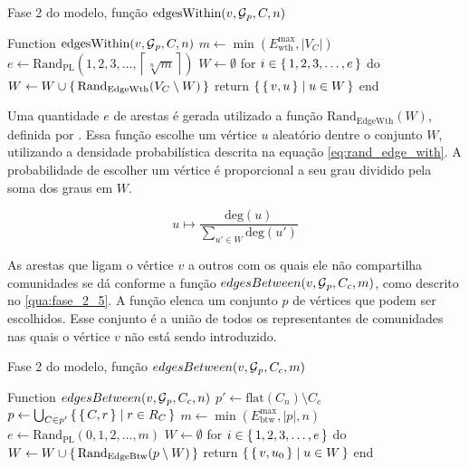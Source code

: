 \documentclass[notes.tex]{subfiles}
\begin{document}
\begin{quadro}[htbp]
\caption{Fase 2 do modelo, função $\text{edgesWithin}(v, \operatorname{\mathcal{G}}_p, C, n)$}
\label{qua:fase_2_4}
\begin{algorithm}
Function $\text{edgesWithin}(v, \operatorname{\mathcal{G}}_p, C, n)$
    $m \leftarrow \min( E_\text{wth}^\text{max}, |V_C| )$
    $e \leftarrow \text{Rand}_\text{PL}({1, 2, 3, \ldots, \left\lceil  \sqrt[n]{m} \right\rceil})$
    $W \leftarrow \emptyset$
    for $i \in \set{1, 2, 3, \ldots, e}$ do $W\leftarrow W \cup \set{\text{Rand}_\text{EdgeWth}(V_C \setminus W)}$
    return $\set{\set{v, u} | u \in W}$
end
\end{algorithm}
\end{quadro}

Uma quantidade $e$ de arestas é gerada utilizado a função $\text{Rand}_\text{EdgeWth}(W)$, definida por .
Essa função escolhe um vértice $u$ aleatório dentre o conjunto $W$, utilizando a densidade probabilística descrita na equação \ref{eq:rand_edge_with}.
A probabilidade de escolher um vértice é proporcional a seu grau dividido pela soma dos graus em $W$.

\begin{equation}\label{eq:rand_edge_with}
    u \mapsto \frac{\text{deg}(u)}{\displaystyle\sum_{u' \in W}^{}\text{deg}(u')}
\end{equation}

As arestas que ligam o vértice $v$ a outros com os quais ele não compartilha comunidades se dá conforme a função $edgesBetween(v, \operatorname{\mathcal{G}}_p, C_c, m)$, como descrito no \autoref{qua:fase_2_5}.
A função elenca um conjunto $p$ de vértices que podem ser escolhidos.
Esse conjunto é a união de todos os representantes de comunidades nas quais o vértice $v$ não está sendo introduzido.

\begin{quadro}[htbp]
\caption{Fase 2 do modelo, função $edgesBetween(v, \operatorname{\mathcal{G}}_p, C_c, m)$}
\label{qua:fase_2_5}
\begin{algorithm}
Function $edgesBetween(v, \operatorname{\mathcal{G}}_p, C_c, n)$
    $p' \leftarrow \text{flat}(C_n)\setminus C_c$
    $p \leftarrow \bigcup_{C \in p'} \set{\set{C, r} | r \in R_C }$
    $m \leftarrow \min( E_\text{btw}^\text{max}, |p|, n)$
    $e \leftarrow \text{Rand}_\text{PL}({0, 1, 2, \ldots, m})$
    $W \leftarrow \emptyset$
    for $i \in \set{1, 2, 3, \ldots, e}$ do $W\leftarrow W \cup \set{\text{Rand}_\text{EdgeBtw}(p \setminus W)}$
    return $\set{\set{v, u_0} | u \in W}$
end
\end{algorithm}
\end{quadro}
\end{document}
